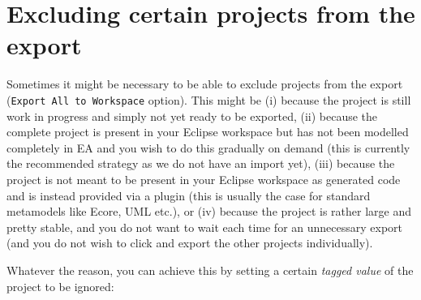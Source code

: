 \section{Excluding certain projects from the export}

Sometimes it might be necessary to be able to exclude projects from the export (\texttt{Export All to Workspace} option).
This might be (i) because the project is still work in progress and simply not yet ready to be exported, (ii) because the complete project is present in your Eclipse workspace but has not been modelled completely in EA and you wish to do this gradually on demand (this is currently the recommended strategy as we do not have an import yet), (iii) because the project is not meant to be present in your Eclipse workspace as generated code and is instead provided via a plugin (this is usually the case for standard metamodels like Ecore, UML etc.), or (iv) because the project is rather large and pretty stable, and you do not want to wait each time for an unnecessary export (and you do not wish to click and export the other projects individually).

Whatever the reason, you can achieve this by setting a certain \emph{tagged value} of the project to be ignored:

